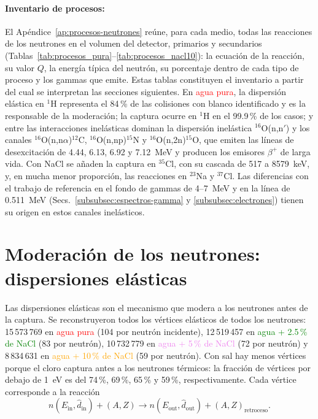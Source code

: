 \paragraph{Inventario de procesos:} El Apéndice~\ref{ap:procesos-neutrones} reúne, para cada medio, todas las reacciones de los neutrones en el volumen del detector, primarios y secundarios (Tablas~\ref{tab:procesos_pura}--\ref{tab:procesos_nacl10}): la ecuación de la reacción, su valor $Q$, la energía típica del neutrón, su porcentaje dentro de cada tipo de proceso y los gammas que emite. Estas tablas constituyen el inventario a partir del cual se interpretan las secciones siguientes. En \textcolor{red}{agua pura}, la dispersión elástica en $^{1}$H representa el 84\,\% de las colisiones con blanco identificado y es la responsable de la moderación; la captura ocurre en $^{1}$H en el 99.9\,\% de los casos; y entre las interacciones inelásticas dominan la dispersión inelástica $^{16}$O(n,n$'$) y los canales $^{16}$O(n,n$\alpha$)$^{12}$C, $^{16}$O(n,np)$^{15}$N y $^{16}$O(n,2n)$^{15}$O, que emiten las líneas de desexcitación de 4.44, 6.13, 6.92 y 7.12~MeV y producen los emisores $\beta^{+}$ de larga vida. Con NaCl se añaden la captura en $^{35}$Cl, con su cascada de 517 a 8579~keV, y, en mucha menor proporción, las reacciones en $^{23}$Na y $^{37}$Cl. Las diferencias con el trabajo de referencia en el fondo de gammas de 4--7~MeV y en la línea de 0.511~MeV (Secs.~\ref{subsubsec:espectros-gamma} y \ref{subsubsec:electrones}) tienen su origen en estos canales inelásticos.

\section{Moderación de los neutrones: dispersiones elásticas}
\label{subsubsec:elasticas}

Las dispersiones elásticas son el mecanismo que modera a los neutrones antes de la captura. Se reconstruyeron todos los vértices elásticos de todos los neutrones: 15\,573\,769 en \textcolor{red}{agua pura} (104 por neutrón incidente), 12\,519\,457 en \textcolor{green}{agua + 2.5\,\% de NaCl} (83 por neutrón), 10\,732\,779 en \textcolor{violet}{agua + 5\,\% de NaCl} (72 por neutrón) y 8\,834\,631 en \textcolor{orange}{agua + 10\,\% de NaCl} (59 por neutrón). Con sal hay menos vértices porque el cloro captura antes a los neutrones térmicos: la fracción de vértices por debajo de 1~eV es del 74\,\%, 69\,\%, 65\,\% y 59\,\%, respectivamente. Cada vértice corresponde a la reacción
\begin{equation}
	n(E_{\mathrm{in}},\hat{d}_{\mathrm{in}}) + (A,Z) \longrightarrow n(E_{\mathrm{out}},\hat{d}_{\mathrm{out}}) + (A,Z)_{\mathrm{retroceso}} .
\end{equation}

